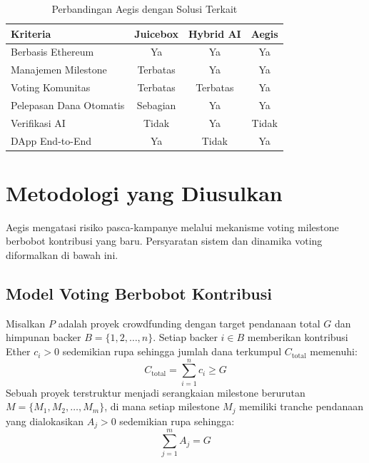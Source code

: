 \documentclass[conference]{IEEEtran}
\begin{document}
\begin{table}[t]
\centering
\caption{Perbandingan Aegis dengan Solusi Terkait}
\label{tab:comparison}
\begin{tabular}{lccc}
\toprule
\textbf{Kriteria} & \textbf{Juicebox \cite{juicebox}} & \textbf{Hybrid AI \cite{hybridai}} & \textbf{Aegis} \\
\midrule
Berbasis Ethereum & Ya & Ya & Ya \\
Manajemen Milestone & Terbatas & Ya & Ya \\
Voting Komunitas & Terbatas & Terbatas & Ya \\
Pelepasan Dana Otomatis & Sebagian & Ya & Ya \\
Verifikasi AI & Tidak & Ya & Tidak \\
DApp End-to-End & Ya & Tidak & Ya \\
\bottomrule
\end{tabular}
\end{table}

\section{Metodologi yang Diusulkan}
Aegis mengatasi risiko pasca-kampanye melalui mekanisme voting milestone berbobot kontribusi yang baru. Persyaratan sistem dan dinamika voting diformalkan di bawah ini.

\subsection{Model Voting Berbobot Kontribusi}
Misalkan $P$ adalah proyek crowdfunding dengan target pendanaan total $G$ dan himpunan backer $B = \{1, 2, \dots, n\}$. Setiap backer $i \in B$ memberikan kontribusi Ether $c_i > 0$ sedemikian rupa sehingga jumlah dana terkumpul $C_{\text{total}}$ memenuhi:
\begin{equation}
C_{\text{total}} = \sum_{i=1}^{n} c_i \ge G
\end{equation}
Sebuah proyek terstruktur menjadi serangkaian milestone berurutan $M = \{M_1, M_2, \dots, M_m\}$, di mana setiap milestone $M_j$ memiliki tranche pendanaan yang dialokasikan $A_j > 0$ sedemikian rupa sehingga:
\begin{equation}
\sum_{j=1}^{m} A_j = G
\end{equation}
\end{document}
